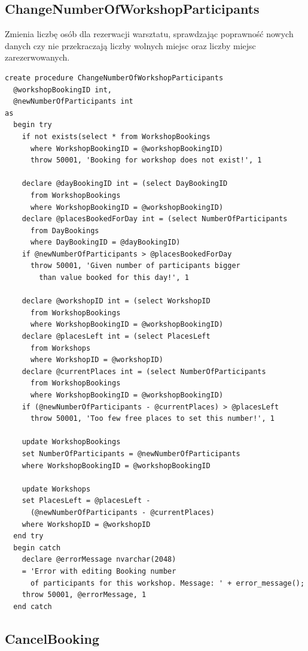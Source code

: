 \documentclass[12pt, a4paper]{mwrep}
\begin{document}
\subsection{ChangeNumberOfWorkshopParticipants}

\noindent Zmienia liczbę osób dla rezerwacji warsztatu, sprawdzając poprawność nowych danych \ppauza czy nie przekraczają liczby wolnych miejsc oraz liczby miejsc zarezerwowanych.

\begin{lstlisting}
create procedure ChangeNumberOfWorkshopParticipants
  @workshopBookingID int,
  @newNumberOfParticipants int
as
  begin try
    if not exists(select * from WorkshopBookings 
      where WorkshopBookingID = @workshopBookingID)
      throw 50001, 'Booking for workshop does not exist!', 1

    declare @dayBookingID int = (select DayBookingID 
      from WorkshopBookings 
      where WorkshopBookingID = @workshopBookingID)
    declare @placesBookedForDay int = (select NumberOfParticipants 
      from DayBookings 
      where DayBookingID = @dayBookingID)
    if @newNumberOfParticipants > @placesBookedForDay
      throw 50001, 'Given number of participants bigger 
        than value booked for this day!', 1

    declare @workshopID int = (select WorkshopID 
      from WorkshopBookings 
      where WorkshopBookingID = @workshopBookingID)
    declare @placesLeft int = (select PlacesLeft 
      from Workshops 
      where WorkshopID = @workshopID)
    declare @currentPlaces int = (select NumberOfParticipants 
      from WorkshopBookings 
      where WorkshopBookingID = @workshopBookingID)
    if (@newNumberOfParticipants - @currentPlaces) > @placesLeft
      throw 50001, 'Too few free places to set this number!', 1

    update WorkshopBookings
    set NumberOfParticipants = @newNumberOfParticipants
    where WorkshopBookingID = @workshopBookingID

    update Workshops
    set PlacesLeft = @placesLeft - 
      (@newNumberOfParticipants - @currentPlaces)
    where WorkshopID = @workshopID
  end try
  begin catch
    declare @errorMessage nvarchar(2048)
    = 'Error with editing Booking number 
      of participants for this workshop. Message: ' + error_message();
    throw 50001, @errorMessage, 1
  end catch
\end{lstlisting}

\subsection{CancelBooking}
\end{document}
